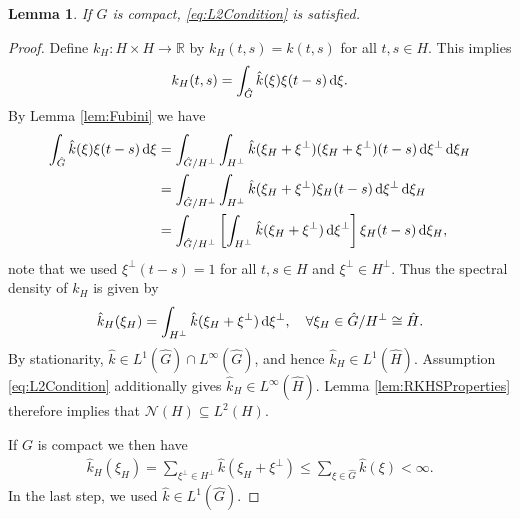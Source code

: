 \documentclass{article}
\renewcommand{\d}{\, \textup{d}}
\newtheorem{lemma}[theorem]{Lemma}
\newcommand{\R}{\mathbb{R}}
\begin{document}
\begin{appendices}
\begin{lemma}
If $G$ is compact, \eqref{eq:L2Condition} is satisfied.
\end{lemma}
\begin{proof}
    Define $k_H:H \times H \to \R$ by $k_H(t,s)=k(t,s)$ for all $t,s \in H$. This implies 
    \begin{align*}
        k_H(t,s)=\int_{\hat{G}} \hat{k}(\xi)\xi(t-s) \d \xi.
    \end{align*}
    By Lemma \ref{lem:Fubini} we have 
    \begin{align*}
        \int_{\hat{G}} \hat{k}(\xi)\xi(t-s) \d \xi 
        &= \int_{\hat{G}/H^\perp} \int_{H^\perp} \hat{k}(\xi_H+\xi^\perp) (\xi_H+\xi^\perp)(t-s) \d \xi^\perp \d \xi_H \\
        &= \int_{\hat{G}/H^\perp} \int_{H^\perp} \hat{k}(\xi_H+\xi^\perp) \xi_H(t-s) \d \xi^\perp \d \xi_H \\
        &= \int_{\hat{G}/H^\perp} \left[ \int_{H^\perp} \hat{k}(\xi_H+\xi^\perp) \d \xi^\perp\right] \xi_H(t-s) \d \xi_H,
    \end{align*}
    note that we used $\xi^\perp(t-s) = 1 $ for all $t,s \in H$ and $\xi^\perp \in H^\perp$. Thus the spectral density of $k_H$ is given by 
    \begin{align*}
        \hat{k}_H(\xi_H)=\int_{H^\perp} \hat{k}(\xi_H+\xi^\perp) \d \xi^\perp, \quad \forall \xi_H \in \hat{G}/H^\perp \cong \hat{H}.
    \end{align*}
    By stationarity, $\hat{k} \in L^1(\hat{G}) \cap L^\infty(\hat{G})$, and hence $\hat{k}_H \in L^1(\hat{H})$. Assumption \eqref{eq:L2Condition} additionally gives $\hat{k}_H \in L^\infty(\hat{H})$. Lemma \ref{lem:RKHSProperties} therefore implies that $\mathcal{N}(H) \subseteq L^2(H)$.  

    If $G$ is compact we then have 
    \begin{align*}
        \hat{k}_H(\xi_H)= \sum_{\xi^\perp \in H^\perp} \hat{k}(\xi_H+\xi^\perp) \leq \sum_{\xi \in \hat{G}} \hat{k}(\xi) < \infty.
    \end{align*}
    In the last step, we used $\hat{k} \in L^1(\hat{G})$.
\end{proof}


\end{appendices}
\end{document}
